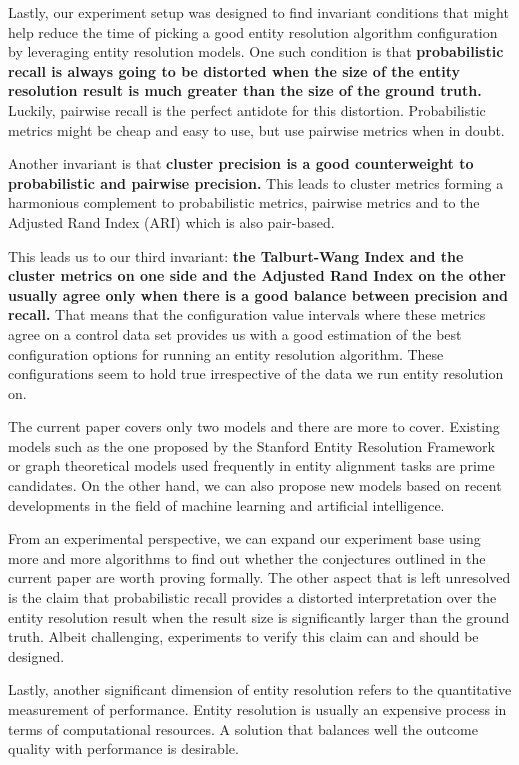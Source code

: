 \documentclass[journal]{IEEEtran}
\begin{document}
    Lastly, our experiment setup was designed to find invariant conditions that
    might help reduce the time of picking a good entity resolution algorithm
    configuration by leveraging entity resolution models.
    One such condition is that \textbf{probabilistic recall is always going to be
    distorted when the size of the entity resolution result is much greater than
    the size of the ground truth.}
    Luckily, pairwise recall is the perfect antidote for this distortion.
    Probabilistic metrics might be cheap and easy to use, but use pairwise
    metrics when in doubt.

    Another invariant is that \textbf{cluster precision is a good counterweight to
    probabilistic and pairwise precision.}
    This leads to cluster metrics forming a harmonious complement to
    probabilistic metrics, pairwise metrics and to the Adjusted Rand Index (ARI)
    which is also pair-based.
    
    This leads us to our third invariant: \textbf{the Talburt-Wang Index and the cluster
    metrics on one side and the Adjusted Rand Index on the other usually agree
    only when there is a good balance between precision and recall.}
    That means that the configuration value intervals where these metrics agree
    on a control data set provides us with a good estimation of the best
    configuration options for running an entity resolution algorithm.
    These configurations seem to hold true irrespective of the data we run
    entity resolution on.


    The current paper covers only two models and there are more to cover.
    Existing models such as the one proposed by the Stanford Entity Resolution
    Framework\cite{Ben2009Swoosh} or graph theoretical models used frequently in
    entity alignment tasks are prime candidates.
    On the other hand, we can also propose new models based on recent
    developments in the field of machine learning and artificial intelligence.

    From an experimental perspective, we can expand our experiment base using
    more and more algorithms to find out whether the conjectures outlined in
    the current paper are worth proving formally.
    The other aspect that is left unresolved is the claim that probabilistic
    recall provides a distorted interpretation over the entity resolution result
    when the result size is significantly larger than the ground truth.
    Albeit challenging, experiments to verify this claim can and should be
    designed.

    Lastly, another significant dimension of entity resolution refers to the
    quantitative measurement of performance.
    Entity resolution is usually an expensive process in terms of computational
    resources.
    A solution that balances well the outcome quality with performance is
    desirable.


    \balance

    
    
\end{document}

